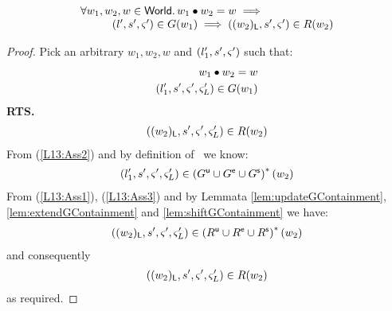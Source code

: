 %
\begin{lemma}[] \label{lem:guaranteeContainment}
%
\[
\begin{array}{l}
	\forall w_1, w_2, w \in \textsf{World}.\, w_1 \bullet w_2 = w \implies\\
	\hspace*{1cm}(l', s', \varsigma_{}') \in G(w_1) \implies ((w_2)_{\textsf{L}}, s', \varsigma_{}') \in R(w_2)
\end{array}
\]
%
\begin{proof} Pick an arbitrary $w_1, w_2, w$ and $(l'_1, s', \varsigma_{}')$ such that:
%
\begin{align}
	w_1 \bullet w_2 = w \label{L13:Ass1}\\
	(l'_1, s', \varsigma_{}', \varsigma_{L}') \in G(w_1) \label{L13:Ass2}
\end{align}
%
\textbf{RTS.}
%
\begin{align}
	((w_2)_{\textsf{L}}, s', \varsigma_{}', \varsigma_{L}') \in R(w_2) \label{L13:Goal}
\end{align}
From (\ref{L13:Ass2}) and by definition of \guarantee\ we know:
%
\begin{align}
	(l'_1, s', \varsigma_{}', \varsigma_{L}') \in \left(G^{\textsf{u}} \cup G^{\textsf{e}} \cup G^{\textsf{s}} \right)^{*}(w_2) \label{L13:Ass3}
\end{align}
%
From (\ref{L13:Ass1}), (\ref{L13:Ass3}) and by Lemmata \ref{lem:updateGContainment}, \ref{lem:extendGContainment} and \ref{lem:shiftGContainment} we have:
%
\begin{align}
	((w_2)_{\textsf{L}}, s', \varsigma_{}', \varsigma_{L}') \in \left(R^{\textsf{u}} \cup R^{\textsf{e}} \cup R^{\textsf{s}} \right)^{*}(w_2) \nonumber
\end{align}
%
and consequently 
%
\begin{align}
	((w_2)_{\textsf{L}}, s', \varsigma_{}', \varsigma_{L}') \in R(w_2) \nonumber
\end{align}
%
as required.
\end{proof}
\end{lemma}
%
%
